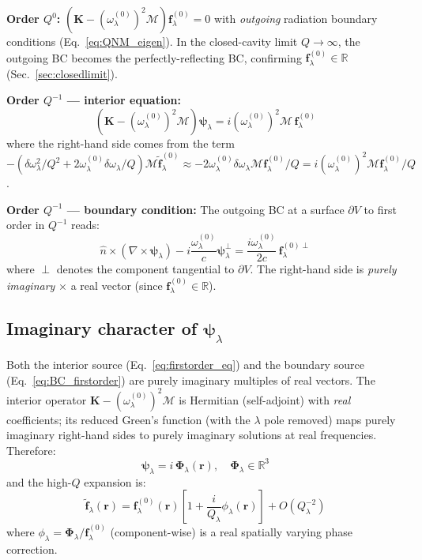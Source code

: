 \documentclass[12pt]{article}
\newcommand{\tf}{\tilde{\mathbf{f}}}
\begin{document}
\textbf{Order $Q^0$:}
$(\mathbf{K}-(\omega_\lambda^{(0)})^2\mathcal{M})\mathbf{f}^{(0)}_\lambda=0$
with \emph{outgoing} radiation boundary conditions (Eq.~\ref{eq:QNM_eigen}).
In the closed-cavity limit $Q\to\infty$, the outgoing BC becomes the
perfectly-reflecting BC, confirming $\mathbf{f}^{(0)}_\lambda\in\mathbb{R}$
(Sec.~\ref{sec:closedlimit}).

\textbf{Order $Q^{-1}$ --- interior equation:}
\begin{equation}
  \left(\mathbf{K}-(\omega_\lambda^{(0)})^2\mathcal{M}\right)\boldsymbol{\psi}_\lambda
  = i(\omega_\lambda^{(0)})^2\mathcal{M}\,\mathbf{f}^{(0)}_\lambda
  \label{eq:firstorder_eq}
\end{equation}
where the right-hand side comes from the term $-(\delta\omega_\lambda^2/Q^2
+ 2\omega_\lambda^{(0)}\delta\omega_\lambda/Q)\mathcal{M}\tf_\lambda^{(0)}
\approx -2\omega_\lambda^{(0)}\delta\omega_\lambda\mathcal{M}\mathbf{f}^{(0)}_\lambda/Q
= i(\omega_\lambda^{(0)})^2\mathcal{M}\mathbf{f}^{(0)}_\lambda/Q$.

\textbf{Order $Q^{-1}$ --- boundary condition:}
The outgoing BC at a surface $\partial V$ to first order in $Q^{-1}$ reads:
\begin{equation}
  \hat{n}\times(\nabla\times\boldsymbol{\psi}_\lambda)
  - i\frac{\omega_\lambda^{(0)}}{c}\boldsymbol{\psi}_\lambda^{\perp}
  = \frac{i\omega_\lambda^{(0)}}{2c}\,\mathbf{f}^{(0)\perp}_\lambda
  \label{eq:BC_firstorder}
\end{equation}
where $\perp$ denotes the component tangential to $\partial V$.  The
right-hand side is \emph{purely imaginary} $\times$ a real vector (since
$\mathbf{f}^{(0)}_\lambda \in \mathbb{R}$).

\subsection*{Imaginary character of $\boldsymbol{\psi}_\lambda$}

Both the interior source (Eq.~\ref{eq:firstorder_eq}) and the boundary
source (Eq.~\ref{eq:BC_firstorder}) are purely imaginary multiples of real
vectors.  The interior operator $\mathbf{K}-(\omega_\lambda^{(0)})^2\mathcal{M}$
is Hermitian (self-adjoint) with \emph{real} coefficients; its reduced
Green's function (with the $\lambda$ pole removed) maps purely imaginary
right-hand sides to purely imaginary solutions at real frequencies.
Therefore:
\begin{equation}
  \boldsymbol{\psi}_\lambda = i\,\mathbf{\Phi}_\lambda(\mathbf{r}),\quad
  \mathbf{\Phi}_\lambda\in\mathbb{R}^3
  \label{eq:psi_is_imaginary}
\end{equation}
and the high-$Q$ expansion is:
\begin{equation}
  \boxed{\tf_\lambda(\mathbf{r}) = \mathbf{f}^{(0)}_\lambda(\mathbf{r})
  \left[1 + \frac{i}{Q_\lambda}\phi_\lambda(\mathbf{r})\right]
  + O(Q_\lambda^{-2})}
  \label{eq:highQ_expansion}
\end{equation}
where $\phi_\lambda = \mathbf{\Phi}_\lambda/\mathbf{f}^{(0)}_\lambda$
(component-wise) is a real spatially varying phase correction.
\end{document}
